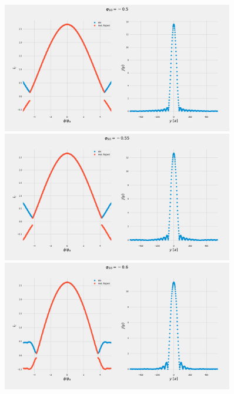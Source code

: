 \documentclass[a4paper]{article}
\begin{document}
\begin{figure}
	\includegraphics[width=0.9\textwidth]{figs/wg32vbg05/current_and_density_05}
	\includegraphics[width=0.9\textwidth]{figs/wg32vbg05/current_and_density_055}
	\includegraphics[width=0.9\textwidth]{figs/wg32vbg05/current_and_density_06}
\end{figure}
\end{document}
